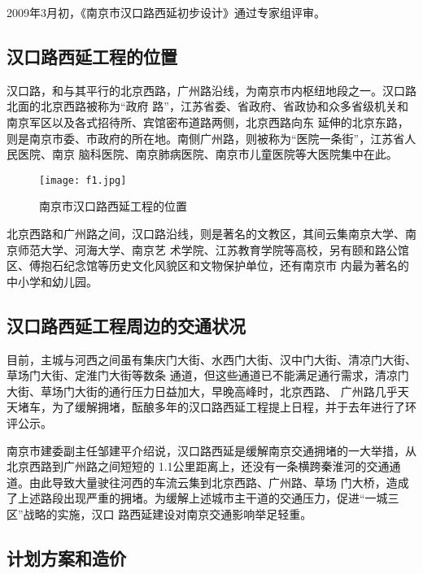 ﻿\documentclass[11pt,a4paper,onecolumn]{article}
\begin{document}
2009年3月初，《南京市汉口路西延初步设计》通过专家组评审。

\subsection{汉口路西延工程的位置}

汉口路，和与其平行的北京西路，广州路沿线，为南京市内枢纽地段之一。汉口路北面的北京西路被称为“政府
路”，江苏省委、省政府、省政协和众多省级机关和南京军区以及各式招待所、宾馆密布道路两侧，北京西路向东
延伸的北京东路，则是南京市委、市政府的所在地。南侧广州路，则被称为“医院一条街”，江苏省人民医院、南京
脑科医院、南京肺病医院、南京市儿童医院等大医院集中在此。

\begin{figure}[hb]
\begin{center}
\vspace{-1ex}
\texttt{[image: f1.jpg]}
\caption{南京市汉口路西延工程的位置}
\label{f1}
\vspace{-3ex}
\end{center}
\end{figure}

北京西路和广州路之间，汉口路沿线，则是著名的文教区，其间云集南京大学、南京师范大学、河海大学、南京艺
术学院、江苏教育学院等高校，另有颐和路公馆区、傅抱石纪念馆等历史文化风貌区和文物保护单位，还有南京市
内最为著名的中小学和幼儿园。

\subsection{汉口路西延工程周边的交通状况}

目前，主城与河西之间虽有集庆门大街、水西门大街、汉中门大街、清凉门大街、草场门大街、定淮门大街等数条
通道，但这些通道已不能满足通行需求，清凉门大街、草场门大街的通行压力日益加大，早晚高峰时，北京西路、
广州路几乎天天堵车，为了缓解拥堵，酝酿多年的汉口路西延工程提上日程，并于去年进行了环评公示。

南京市建委副主任邹建平介绍说，汉口路西延是缓解南京交通拥堵的一大举措，从北京西路到广州路之间短短的
1.1公里距离上，还没有一条横跨秦淮河的交通通道。由此导致大量驶往河西的车流云集到北京西路、广州路、草场
门大桥，造成了上述路段出现严重的拥堵。为缓解上述城市主干道的交通压力，促进“一城三区”战略的实施，汉口
路西延建设对南京交通影响举足轻重。

\subsection{计划方案和造价}
\end{document}

